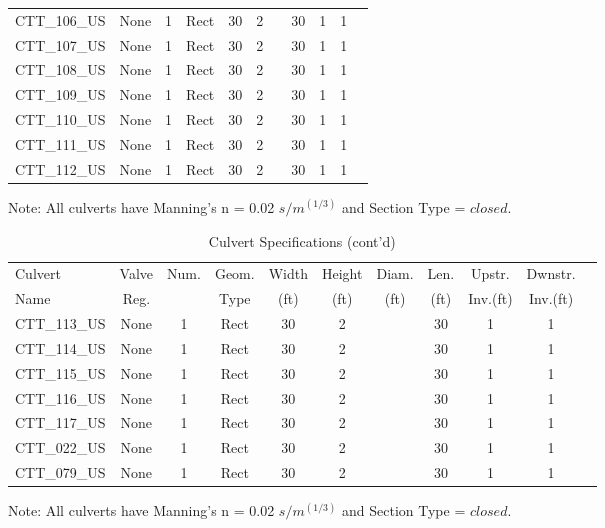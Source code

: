 \begin{table}[]
\begin{tabular}{@{}lcccccccccc@{}}
CTT\_106\_US  & None       & 1        & Rect & 30     & 2     &          & 30     & 1         & 1          \\
CTT\_107\_US  & None       & 1        & Rect & 30     & 2     &          & 30     & 1         & 1          \\
CTT\_108\_US  & None       & 1        & Rect & 30     & 2     &          & 30     & 1         & 1          \\
CTT\_109\_US  & None       & 1        & Rect & 30     & 2     &          & 30     & 1         & 1          \\
CTT\_110\_US  & None       & 1        & Rect & 30     & 2     &          & 30     & 1         & 1          \\
CTT\_111\_US  & None       & 1        & Rect & 30     & 2     &          & 30     & 1         & 1          \\
CTT\_112\_US  & None       & 1        & Rect & 30     & 2     &          & 30     & 1         & 1          \\
\bottomrule
\end{tabular}

Note: All culverts have Manning's n = 0.02 $s/m^{(1/3)}$ and Section Type = $closed$.
\end{table}

\begin{table}[]
\caption{Culvert Specifications (cont'd)}
\label{tab:culv-specs4}
\begin{tabular}{@{}lcccccccccc@{}}
\toprule
Culvert       & Valve      & Num.     & Geom.& Width  & Height & Diam.    & Len.   & Upstr.    & Dwnstr.    \\
Name          & Reg.       &          & Type & (ft)   & (ft)   & (ft)     & (ft)   & Inv.(ft)  & Inv.(ft)   \\
\midrule
CTT\_113\_US  & None       & 1        & Rect & 30     & 2      &          & 30     & 1         & 1          \\
CTT\_114\_US  & None       & 1        & Rect & 30     & 2      &          & 30     & 1         & 1          \\
CTT\_115\_US  & None       & 1        & Rect & 30     & 2      &          & 30     & 1         & 1          \\
CTT\_116\_US  & None       & 1        & Rect & 30     & 2      &          & 30     & 1         & 1          \\
CTT\_117\_US  & None       & 1        & Rect & 30     & 2      &          & 30     & 1         & 1          \\
CTT\_022\_US  & None       & 1        & Rect & 30     & 2      &          & 30     & 1         & 1          \\
CTT\_079\_US  & None       & 1        & Rect & 30     & 2      &          & 30     & 1         & 1          \\
\bottomrule
\end{tabular}

Note: All culverts have Manning's n = 0.02 $s/m^{(1/3)}$ and Section Type = $closed$.
\end{table}

